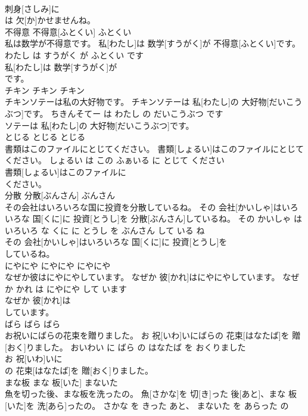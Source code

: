\documentclass[8pt]{extreport}
\begin{document}
\begin{CJK}{UTF8}{min}
\\	刺身[さしみ]に
\\	は 欠[か]かせませんね。			
\\	不得意	不得意[ふとくい]	ふとくい	
\\	私は数学が不得意です。	私[わたし]は 数学[すうがく]が 不得意[ふとくい]です。	わたし は すうがく が ふとくい です	
\\	私[わたし]は 数学[すうがく]が
\\	です。			
\\	チキン	チキン	チキン	
\\	チキンソテーは私の大好物です。	チキンソテーは 私[わたし]の 大好物[だいこうぶつ]です。	ちきんそてー は わたし の だいこうぶつ です	
\\	ソテーは 私[わたし]の 大好物[だいこうぶつ]です。			
\\	とじる	とじる	とじる	
\\	書類はこのファイルにとじてください。	書類[しょるい]はこのファイルにとじてください。	しょるい は この ふぁいる に とじて ください	
\\	書類[しょるい]はこのファイルに
\\	ください。			
\\	分散	分散[ぶんさん]	ぶんさん	
\\	その会社はいろいろな国に投資を分散しているね。	その 会社[かいしゃ]はいろいろな 国[くに]に 投資[とうし]を 分散[ぶんさん]しているね。	その かいしゃ は いろいろ な くに に とうし を ぶんさん して いる ね	
\\	その 会社[かいしゃ]はいろいろな 国[くに]に 投資[とうし]を
\\	しているね。			
\\	にやにや	にやにや	にやにや	
\\	なぜか彼はにやにやしています。	なぜか 彼[かれ]はにやにやしています。	なぜ か かれ は にやにや して います	
\\	なぜか 彼[かれ]は
\\	しています。			
\\	ばら	ばら	ばら	
\\	お祝いにばらの花束を贈りました。	お 祝[いわ]いにばらの 花束[はなたば]を 贈[おく]りました。	おいわい に ばら の はなたば を おくりました	
\\	お 祝[いわ]いに
\\	の 花束[はなたば]を 贈[おく]りました。			
\\	まな板	まな 板[いた]	まないた	
\\	魚を切った後、まな板を洗ったの。	魚[さかな]を 切[き]った 後[あと]、まな 板[いた]を 洗[あら]ったの。	さかな を きった あと、 まないた を あらった の	

\end{CJK}
\end{document}
